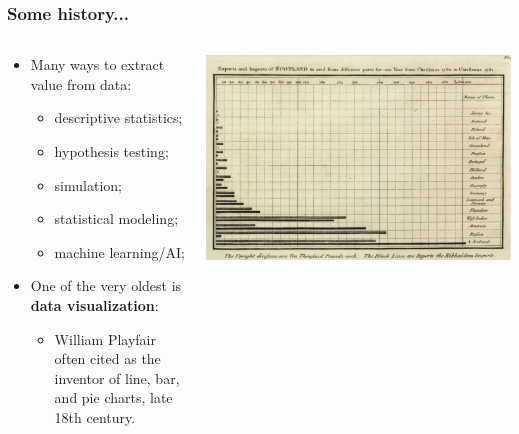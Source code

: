 \documentclass[aspectratio=169]{beamer}
\theoremstyle{principle}
\begin{document}
\begin{frame}
\frametitle{Some history...}

\begin{columns}
\begin{column}{0.5\textwidth}

\begin{itemize}
\item Many ways to extract value from data:
\begin{itemize}
\item descriptive statistics;
\item hypothesis testing;
\item simulation;
\item statistical modeling;
\item machine learning/AI;
\end{itemize}
\bigskip
\bigskip
\item One of the very oldest is \textbf{data visualization}:
\begin{itemize}
\item William Playfair often cited as the inventor of line, bar, and pie charts, late 18th century.
\end{itemize}
\end{itemize}

\end{column}
\begin{column}{0.5\textwidth}
\includegraphics[scale=0.25]{1786_Playfair_-_Exports_and_Imports_of_Scotland_to_and_from_different_parts_for_one_Year_from_Christmas_1780_to_Christmas_1781.jpg}
\end{column}
\end{columns}

\end{frame}
\end{document}
